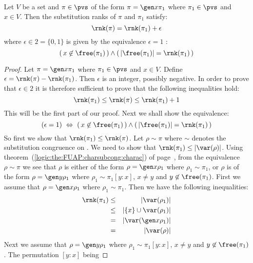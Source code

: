 \begin{prop}\label{logic:prop:FUAP:substrank:recursion:gen}
Let $V$ be a set and $\pi\in\pvs$ of the form $\pi=\gen x\pi_{1}$
where $\pi_{1}\in\pvs$ and $x\in V$. Then the substitution ranks of
$\pi$ and $\pi_{1}$ satisfy:
    \[
    \rnk(\pi)=\rnk(\pi_{1})+\epsilon
    \]
where $\epsilon\in 2=\{0,1\}$ is given by the equivalence
$\epsilon=1$ \ifand:
    \[
    (\,x\not\in\free(\pi_{1})\,)\land(\,|\free(\pi_{1})|
    =\rnk(\pi_{1})\,)
    \]
\end{prop}
\begin{proof}
Let $\pi=\gen x\pi_{1}$ where $\pi_{1}\in\pvs$ and $x\in V$. Define
$\epsilon = \rnk(\pi)-\rnk(\pi_{1})$. Then $\epsilon$ is an integer,
possibly negative. In order to prove that $\epsilon\in 2$ it is
therefore sufficient to prove that the following inequalities hold:
    \begin{equation}\label{logic:eqn:FUAP:substrank:recursion:gen:1}
    \rnk(\pi_{1})\leq\rnk(\pi)\leq\rnk(\pi_{1})+1
    \end{equation}
This will be the first part of our proof. Next we shall show the
equivalence:
    \begin{equation}\label{logic:eqn:FUAP:substrank:recursion:gen:2}
    (\epsilon =1)\ \Leftrightarrow\
    (\,x\not\in\free(\pi_{1})\,)\land(\,|\free(\pi_{1})|
    =\rnk(\pi_{1})\,)
    \end{equation}
So first we show that $\rnk(\pi_{1})\leq\rnk(\pi)$. Let
$\rho\sim\pi$ where $\sim$ denotes the substitution congruence on
\pvs. We need to show that $\rnk(\pi_{1})\leq|\var(\rho)|$. Using
theorem~(\ref{logic:the:FUAP:charsubcong:charac}) of
page~\pageref{logic:the:FUAP:charsubcong:charac}, from the
equivalence $\rho\sim\pi$ we see that $\rho$ is either of the form
$\rho=\gen x\rho_{1}$ where $\rho_{1}\sim\pi_{1}$, or $\rho$ is of
the form $\rho=\gen y\rho_{1}$ where $\rho_{1}\sim\pi_{1}[y\!:\!x]$,
$x\neq y$ and $y\not\in\free(\pi_{1})$. First we assume that
$\rho=\gen x\rho_{1}$ where $\rho_{1}\sim\pi_{1}$. Then we have the
following inequalities:
    \begin{eqnarray*}
    \rnk(\pi_{1})&\leq&|\var(\rho_{1})|\\
    &\leq&|\{x\}\cup\var(\rho_{1})|\\
    &=&|\var(\gen x\rho_{1})|\\
    &=&|\var(\rho)|
    \end{eqnarray*}
Next we assume that $\rho=\gen y\rho_{1}$ where
$\rho_{1}\sim\pi_{1}[y\!:\!x]$, $x\neq y$ and
$y\not\in\free(\pi_{1})$. The permutation $[y\!:\!x]$ being

\end{proof}
